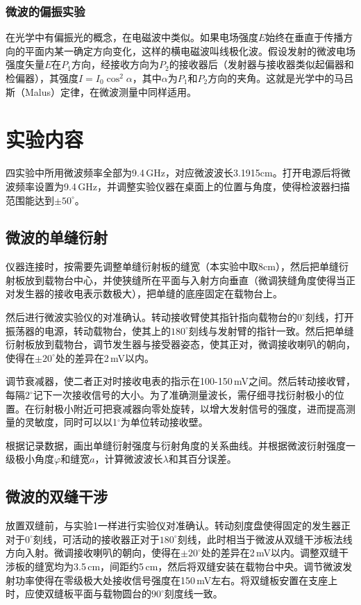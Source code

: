 \documentclass[12pt]{article}
\begin{document}
\subsubsection{微波的偏振实验}
在光学中有偏振光的概念，在电磁波中类似。如果电场强度$E$始终在垂直于传播方向的平面内某一确定方向变化，这样的横电磁波叫线极化波。假设发射的微波电场强度矢量$E$在$P_1$方向，经接收方向为$P_2$的接收器后（发射器与接收器类似起偏器和检偏器），其强度$I=I_0\cos^2\alpha$，其中$\alpha$为$P_1$和$P_2$方向的夹角。这就是光学中的马吕斯（Malus）定律，在微波测量中同样适用。

\section{实验内容}
四实验中所用微波频率全部为9.4\,GHz，对应微波波长3.1915cm。打开电源后将微波频率设置为9.4\,GHz，并调整实验仪器在桌面上的位置与角度，使得检波器扫描范围能达到$ \pm50^\circ $。

\subsection{微波的单缝衍射}
仪器连接时，按需要先调整单缝衍射板的缝宽（本实验中取8cm），然后把单缝衍射板放到载物台中心，并使狭缝所在平面与入射方向垂直（微调狭缝角度使得当正对发生器的接收电表示数极大），把单缝的底座固定在载物台上。

然后进行微波实验仪的对准确认。转动接收臂使其指针指向载物台的$ 0^\circ $刻线，打开振荡器的电源，转动载物台，使其上的$ 180^\circ $刻线与发射臂的指针一致。然后把单缝衍射板放到载物台，调节发生器与接受器姿态，使其正对，微调接收喇叭的朝向，使得在$ \pm20^\circ $处的差异在2\,mV以内。

调节衰减器，使二者正对时接收电表的指示在100-150\,mV之间。然后转动接收臂，每隔$ 2^\circ $记下一次接收信号的大小。为了准确测量波长，需仔细寻找衍射极小的位置。在衍射极小附近可把衰减器向零处旋转，以增大发射信号的强度，进而提高测量的灵敏度，同时可以以1$^\circ$为单位转动接收壁。

根据记录数据，画出单缝衍射强度与衍射角度的关系曲线。并根据微波衍射强度一级极小角度$ \varphi $和缝宽$a$，计算微波波长$\lambda$和其百分误差。

\subsection{微波的双缝干涉}
放置双缝前，与实验1一样进行实验仪对准确认。转动刻度盘使得固定的发生器正对于$0^\circ $刻线，可活动的接收器正对于$180^\circ$刻线，此时相当于微波从双缝干涉板法线方向入射。微调接收喇叭的朝向，使得在$ \pm20^\circ $处的差异在2\,mV以内。调整双缝干涉板的缝宽均为3.5\,cm，间距约5\,cm，然后将双缝安装在载物台中央。调节微波发射功率使得在零级极大处接收信号强度在150\,mV左右。将双缝板安置在支座上时，应使双缝板平面与载物圆台的$ 90^\circ $刻度线一致。
\end{document}
